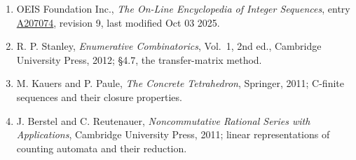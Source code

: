 \documentclass[11pt]{article}
\theoremstyle{definition}
\begin{document}
\begin{enumerate}

\item OEIS Foundation Inc., \emph{The On-Line Encyclopedia of Integer Sequences}, entry \href{https://oeis.org/A207074}{A207074}, revision 9, last modified Oct 03 2025.

\item R. P. Stanley, \emph{Enumerative Combinatorics}, Vol.~1, 2nd ed., Cambridge University Press, 2012; \S4.7, the transfer-matrix method.

\item M. Kauers and P. Paule, \emph{The Concrete Tetrahedron}, Springer, 2011; C-finite sequences and their closure properties.

\item J. Berstel and C. Reutenauer, \emph{Noncommutative Rational Series with Applications}, Cambridge University Press, 2011; linear representations of counting automata and their reduction.

\end{enumerate}
\end{document}
